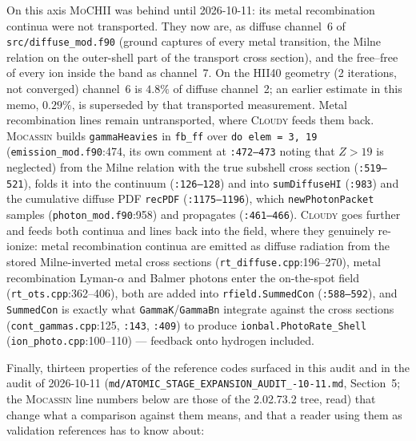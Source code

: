 \documentclass[english,a4paper]{my_memo}
\newcommand{\code}[1]{\texttt{#1}}
\newcommand{\MoCHII}{\textsc{MoCHII}}
\newcommand{\Mocassin}{\textsc{Mocassin}}
\newcommand{\Cloudy}{\textsc{Cloudy}}
\begin{document}
On this axis \MoCHII{} was behind until 2026-10-11: its metal recombination
continua were not transported.  They now are, as diffuse channel~6 of
\code{src/diffuse\_\allowbreak mod.f90} (ground captures of every metal
transition, the Milne relation on the outer-shell part of the transport
cross section), and the free--free of every ion inside the band as
channel~7.  On the HII40 geometry (2 iterations, not converged) channel~6
is $4.8\%$ of diffuse channel~2; an earlier estimate in this memo, $0.29\%$,
is superseded by that transported measurement.  Metal recombination lines
remain untransported, where \Cloudy{} feeds them back.  \Mocassin{} builds
\code{gammaHeavies} in \code{fb\_ff} over \code{do elem = 3, 19}
(\code{emission\_\allowbreak mod.f90}:474, its own comment at \code{:472--473} noting
that $Z>19$ is neglected) from the Milne relation with the true subshell
cross section (\code{:519--521}), folds it into the continuum
(\code{:126--128}) and into \code{sumDiffuseHI} (\code{:983}) and the
cumulative diffuse PDF \code{recPDF} (\code{:1175--1196}), which
\code{new\allowbreak Photon\allowbreak Packet} samples (\code{photon\_\allowbreak mod.f90}:958) and propagates
(\code{:461--466}).  \Cloudy{} goes further and feeds both continua and lines
back into the field, where they genuinely re-ionize: metal recombination
continua are emitted as diffuse radiation from the stored Milne-inverted
metal cross sections (\code{rt\_diffuse.cpp}:196--270), metal recombination
Lyman-$\alpha$ and Balmer photons enter the on-the-spot field
(\code{rt\_ots.cpp}:362--406), both are added into \code{rfield.SummedCon}
(\code{:588--592}), and \code{SummedCon} is exactly what
\code{GammaK}/\code{GammaBn} integrate against the cross sections
(\code{cont\_\allowbreak gammas.cpp}:125, \code{:143}, \code{:409}) to produce
\code{ionbal.Photo\allowbreak Rate\_\allowbreak Shell} (\code{ion\_photo.cpp}:100--110) --- feedback
onto hydrogen included.

Finally, thirteen properties of the reference codes surfaced in this audit
and in the audit of 2026-10-11
(\code{md/\allowbreak ATOMIC\_STAGE\_\allowbreak EXPANSION\_\allowbreak AUDIT\_\allowbreak 2026-10-11.md}, Section~5; the
\Mocassin{} line numbers below are those of the 2.02.73.2 tree, read) that
change what a comparison against them means, and that a reader using them as
validation references has to know about:
\end{document}
